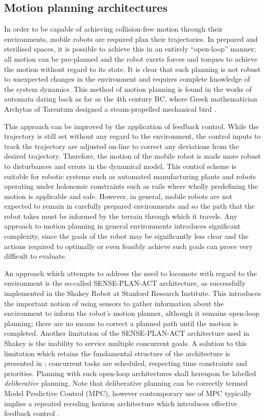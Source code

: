 \subsection{Motion planning architectures}
In order to be capable of achieving collision-free motion through their environments, mobile robots are required plan their trajectories. In prepared and sterilised spaces, it is possible to achieve this in an entirely ``open-loop'' manner; all motion can be pre-planned and the robot exerts forces and torques to achieve the motion without regard to its state. It is clear that such planning is not robust to unexpected changes in the environment and requires complete knowledge of the system dynamics. This method of motion planning is found in the works of automata dating back as far as the 4th century BC, where Greek mathematician Archytas of Tarentum designed a steam-propelled mechanical bird \cite{winter2007corpus}.

This approach can be improved by the application of feedback control. While the trajectory is still set without any regard to the environment, the control inputs to track the trajectory are adjusted on-line to correct any deviations from the desired trajectory. Therefore, the motion of the mobile robot is made more robust to disturbances and errors in the dynamical model. This control scheme is suitable for robotic systems such as automated manufacturing plants and robots operating under holonomic constraints such as rails where wholly predefining the motion is applicable and safe. However, in general, mobile robots are not expected to remain in carefully prepared environments and so the path that the robot takes must be informed by the terrain through which it travels. Any approach to motion planning in general environments introduces significant complexity, since the goals of the robot may be significantly less clear and the actions required to optimally or even feasibly achieve such goals can prove very difficult to evaluate.

An approach which attempts to address the need to locomote with regard to the environment is the so-called SENSE-PLAN-ACT architecture, as successfully implemented in the Shakey Robot at Stanford Research Institute\cite{shakey1968}. This introduces the important notion of using sensors to gather information about the environment to inform the robot's motion planner, although it remains open-loop planning; there are no means to correct a planned path until the motion is completed. Another limitation of the SENSE-PLAN-ACT architecture used in Shakey is the inability to service multiple concurrent goals. A solution to this limitation which retains the fundamental structure of the architecture is presented in \cite{vere1983planning}; concurrent tasks are scheduled, respecting time constraints and priorities. Planning with such open-loop architectures shall hereupon be labelled \textit{deliberative} planning. Note that deliberative planning can be correctly termed Model Predictive Control (MPC), however contemporary use of MPC typically implies a repeated receding horizon architecture which introduces effective feedback control \cite{camacho2013model}.

